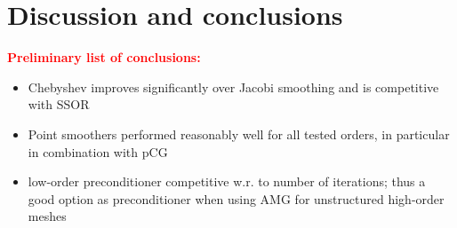 \documentclass[smallcondensed,final]{svjour3}     %
\newcommand{\todo}[1]{\textcolor{red}{\bf #1}}
\newcommand{\gsnote}[1]{\textcolor{blue}{GS: #1}}
\begin{document}





\section{Discussion and conclusions}


\todo{Preliminary list of conclusions:}
\begin{itemize}
\item Chebyshev improves significantly over Jacobi smoothing and is
  competitive with SSOR
\item Point smoothers performed reasonably well for all tested orders,
  in particular in combination with pCG
\item low-order preconditioner competitive w.r. to number of
  iterations; thus a good option as preconditioner when using AMG for
  unstructured high-order meshes

\end{itemize}




\end{document}
